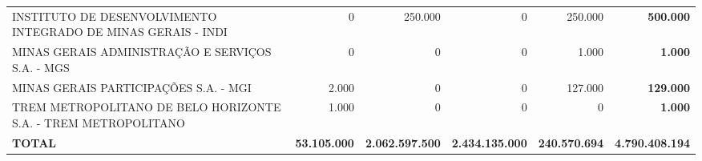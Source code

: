 \documentclass{article}
\begin{document}
\begin{longtable}[c]{m{5cm}|m{2.5cm}|m{2.5cm}|m{2.5cm}|m{2cm}|m{2cm}}
\multicolumn{1}{L{5cm}|}{INSTITUTO DE DESENVOLVIMENTO INTEGRADO DE MINAS GERAIS - INDI} & \multicolumn{1}{r|}{         0} & \multicolumn{1}{r|}{250.000} & \multicolumn{1}{r|}{            0} & \multicolumn{1}{r|}{250.000} & \multicolumn{1}{r}{ \textbf{500.000}} \\
\multicolumn{1}{L{5cm}|}{MINAS GERAIS ADMINISTRAÇÃO E SERVIÇOS S.A. - MGS} & \multicolumn{1}{r|}{         0} & \multicolumn{1}{r|}{            0} & \multicolumn{1}{r|}{            0} & \multicolumn{1}{r|}{1.000} & \multicolumn{1}{r}{ \textbf{1.000}} \\
\multicolumn{1}{L{5cm}|}{MINAS GERAIS PARTICIPAÇÕES S.A. - MGI} & \multicolumn{1}{r|}{2.000} & \multicolumn{1}{r|}{            0} & \multicolumn{1}{r|}{            0} & \multicolumn{1}{r|}{127.000} & \multicolumn{1}{r}{ \textbf{129.000}} \\
\multicolumn{1}{L{5cm}|}{TREM METROPOLITANO DE BELO HORIZONTE S.A. - TREM METROPOLITANO} & \multicolumn{1}{r|}{1.000} & \multicolumn{1}{r|}{            0} & \multicolumn{1}{r|}{            0} & \multicolumn{1}{r|}{          0} & \multicolumn{1}{r}{ \textbf{1.000}} \\
\hline
\multicolumn{1}{L{5cm}|}{ \textbf{TOTAL}} & \multicolumn{1}{r|}{ \textbf{53.105.000}} & \multicolumn{1}{r|}{ \textbf{2.062.597.500}} & \multicolumn{1}{r|}{ \textbf{2.434.135.000}} & \multicolumn{1}{r|}{ \textbf{240.570.694}} & \multicolumn{1}{r}{ \textbf{4.790.408.194}} \\\end{longtable}
\end{document}
